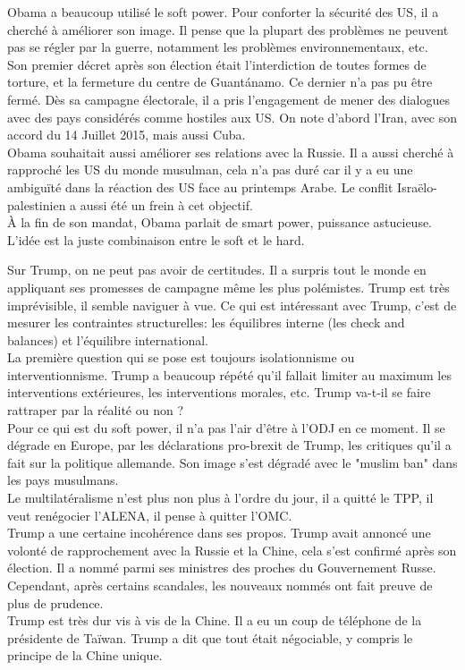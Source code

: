 \documentclass[10pt, a4paper, openany]{book}
\begin{document}
Obama a beaucoup utilisé le soft power. Pour conforter la sécurité des US, il a cherché à améliorer son image. Il pense que la plupart des problèmes ne peuvent pas se régler par la guerre, notamment les problèmes environnementaux, etc. \\
Son premier décret après son élection était l'interdiction de toutes formes de torture, et la fermeture du centre de Guantánamo. Ce dernier n'a pas pu être fermé. Dès sa campagne électorale, il a pris l'engagement de mener des dialogues avec des pays considérés comme hostiles aux US. On note d'abord l'Iran, avec son accord du 14 Juillet 2015, mais aussi Cuba. \\
Obama souhaitait aussi améliorer ses relations avec la Russie. Il a aussi cherché à rapproché les US du monde musulman, cela n'a pas duré car il y a eu une ambiguïté dans la réaction des US face au printemps Arabe. Le conflit Israëlo-palestinien a aussi été un frein à cet objectif. \\
À la fin de son mandat, Obama parlait de smart power, puissance astucieuse. L'idée est la juste combinaison entre le soft et le hard. 


Sur Trump, on ne peut pas avoir de certitudes. Il a surpris tout le monde en appliquant ses promesses de campagne même les plus polémistes. Trump est très imprévisible, il semble naviguer à vue. Ce qui est intéressant avec Trump, c'est de mesurer les contraintes structurelles: les équilibres interne (les check and balances) et l'équilibre international. \\
La première question qui se pose est toujours isolationnisme ou interventionnisme. Trump a beaucoup répété qu'il fallait limiter au maximum les interventions extérieures, les interventions morales, etc. Trump va-t-il se faire rattraper par la réalité ou non ? \\
Pour ce qui est du soft power, il n'a pas l'air d'être à l'ODJ en ce moment. Il se dégrade en Europe, par les déclarations pro-brexit de Trump, les critiques qu'il a fait sur la politique allemande. Son image s'est dégradé avec le "muslim ban" dans les pays musulmans. \\
Le multilatéralisme n'est plus non plus à l'ordre du jour, il a quitté le TPP, il veut renégocier l'ALENA, il pense à quitter l'OMC. \\
Trump a une certaine incohérence dans ses propos. Trump avait annoncé une volonté de rapprochement avec la Russie et la Chine, cela s'est confirmé après son élection. Il a nommé parmi ses ministres des proches du Gouvernement Russe. Cependant, après certains scandales, les nouveaux nommés ont fait preuve de plus de prudence. \\
Trump est très dur vis à vis de la Chine. Il a eu un coup de téléphone de la présidente de Taïwan. Trump a dit que tout était négociable, y compris le principe de la Chine unique. 
\end{document}
